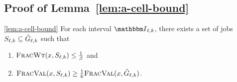 \subsection{Proof of Lemma~\ref{lem:a-cell-bound}}

\begin{numberedlemma}{\ref{lem:a-cell-bound}}
    For each interval $\Int_{\ell,k}$, there exists a set of jobs
    $S_{\ell,k} \subseteq {\tilde{G}}_{\ell,k}$ such that
    \begin{enumerate}[label=\roman*., leftmargin=2\parindent]
        \item ${\normalfont\textsc{FracWt}}(x, S_{\ell,k}) \le \frac1\beta$ and
        \item ${\normalfont\textsc{FracVal}}(x, S_{\ell,k}) \ge \frac16 {\normalfont\textsc{FracVal}}(x, {\tilde{G}}_{\ell,k})$.
    \end{enumerate}

\end{numberedlemma}

